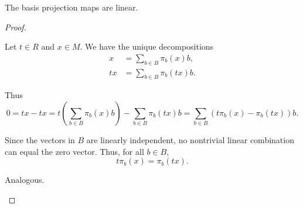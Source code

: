 \begin{proposition}\label{thm:left_module_basis_projections_are_linear}
  The basis projection maps are linear.
\end{proposition}
\begin{proof}\mbox{}
  \begin{description}
     Let \( t \in R \) and \( x \in M \). We have the unique decompositions
    \begin{align*}
      x &= \sum_{b \in B} \pi_b(x) b, \\
      tx &= \sum_{b \in B} \pi_b(tx) b.
    \end{align*}

    Thus
    \begin{equation*}
      0
      =
      tx - tx
      =
      t \left( \sum_{b \in B} \pi_b(x) b \right) - \sum_{b \in B} \pi_b(tx) b
      =
      \sum_{b \in B} (t \pi_b(x) - \pi_b(tx)) b.
    \end{equation*}

    Since the vectors in \( B \) are linearly independent, no nontrivial linear combination can equal the zero vector. Thus, for all \( b \in B \),
    \begin{equation*}
      t \pi_b(x) = \pi_b(tx).
    \end{equation*}

     Analogous.
  \end{description}
\end{proof}

